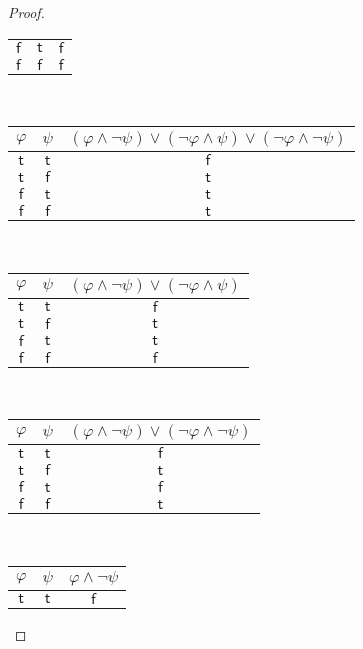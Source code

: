 \documentclass[12pt]{article}
\begin{document}
\begin{proof}
\begin{center}
\begin{tabular}{cc|c}
            $\mathsf{f}$ & $\mathsf{t}$ & $\mathsf{f}$ \\
            $\mathsf{f}$ & $\mathsf{f}$ & $\mathsf{f}$ \\
        \end{tabular}
        ~~
        \begin{tabular}{cc|c}
            $\varphi$ & $\psi$ & $(\varphi \land \neg \psi) \lor (\neg \varphi \land \psi) \lor (\neg \varphi \land \neg \psi)$ \\ \hline
            $\mathsf{t}$ & $\mathsf{t}$ & $\mathsf{f}$ \\
            $\mathsf{t}$ & $\mathsf{f}$ & $\mathsf{t}$ \\
            $\mathsf{f}$ & $\mathsf{t}$ & $\mathsf{t}$ \\
            $\mathsf{f}$ & $\mathsf{f}$ & $\mathsf{t}$ \\
        \end{tabular}
        ~~
        \begin{tabular}{cc|c}
            $\varphi$ & $\psi$ & $(\varphi \land \neg \psi) \lor (\neg \varphi \land \psi)$ \\ \hline
            $\mathsf{t}$ & $\mathsf{t}$ & $\mathsf{f}$ \\
            $\mathsf{t}$ & $\mathsf{f}$ & $\mathsf{t}$ \\
            $\mathsf{f}$ & $\mathsf{t}$ & $\mathsf{t}$ \\
            $\mathsf{f}$ & $\mathsf{f}$ & $\mathsf{f}$ \\
        \end{tabular}
        ~~
        \begin{tabular}{cc|c}
            $\varphi$ & $\psi$ & $(\varphi \land \neg \psi) \lor (\neg \varphi \land \neg \psi)$ \\ \hline
            $\mathsf{t}$ & $\mathsf{t}$ & $\mathsf{f}$ \\
            $\mathsf{t}$ & $\mathsf{f}$ & $\mathsf{t}$ \\
            $\mathsf{f}$ & $\mathsf{t}$ & $\mathsf{f}$ \\
            $\mathsf{f}$ & $\mathsf{f}$ & $\mathsf{t}$ \\
        \end{tabular}
        ~~
        \begin{tabular}{cc|c}
            $\varphi$ & $\psi$ & $\varphi \land \neg \psi$ \\ \hline
            $\mathsf{t}$ & $\mathsf{t}$ & $\mathsf{f}$ \\

\end{tabular}
\end{center}
\end{proof}
\end{document}
